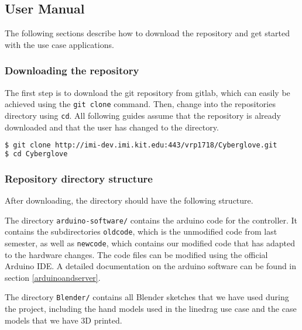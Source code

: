 \subsection{User Manual}
The following sections describe how to download the repository and get started with the use case applications.

\subsubsection{Downloading the repository}

The first step is to download the git repository from gitlab, which can easily be achieved using the \texttt{git clone} command. Then, change into the repositories directory using \texttt{cd}. All following guides assume that the repository is already downloaded and that the user has changed to the directory.

\begin{lstlisting}[language=bash]
$ git clone http://imi-dev.imi.kit.edu:443/vrp1718/Cyberglove.git
$ cd Cyberglove
\end{lstlisting}

\subsubsection{Repository directory structure}

After downloading, the directory should have the following structure.


The directory \texttt{arduino-software/} contains the arduino code for the controller. It contains the subdirectories \texttt{oldcode}, which is the unmodified code from last semester, as well as \texttt{newcode}, which contains our modified code that has adapted to the hardware changes. The code files can be modified using the official Arduino IDE. A detailed documentation on the arduino software can be found in section \ref{arduinoandserver}. 

The directory \texttt{Blender/} contains all Blender sketches that we have used during the project, including the hand models used in the linedrag use case and the case models that we have 3D printed.

